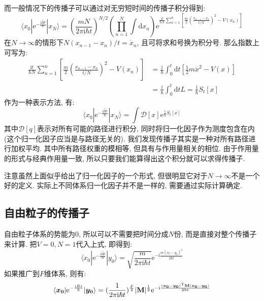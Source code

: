        \splitline

        而一般情况下的传播子可以通过对无穷短时间的传播子积分得到:
        \begin{equation}
            \langle x_0 | \mathrm{e}^{-\frac {\mathrm{i}\hat{H}t}{\hbar}} | x_N \rangle = \left(\frac{mN}{2\pi\mathrm{i}\hbar t}\right)^{N/2} \left(\prod_{n = 1}^{N}\int 
            \mathrm{d} x_n \right) \mathrm{e}^{ \frac{\mathrm{i}t}{\hbar N} \sum_{n = 1}^{n} \left[ \frac{m}{2} \left(\frac{x_{n-1} - x_n}{t/N}\right)^2 - V(x_n)\right] }
        \end{equation}
        在$N \to \infty$的情形下$N(x_{n-1} - x_n)/t = \dot x_n$, 且可将求和号换为积分号. 那么指数上可写为: 
        \begin{equation}\begin{aligned}
            \frac{\mathrm{i}t}{\hbar N} \sum_{n = 1}^{n} \left[ \frac{m}{2} \left(\frac{x_{n-1} - x_n}{t/N}\right)^2 - V(x_n)\right] &= \frac{\mathrm{i}}{\hbar} \int_0^t \mathrm{d}t \left[ \frac{1}{2} m \dot x^2 - V(x) \right]\\
            &= \frac{\mathrm{i}}{\hbar} \int_0^t \mathrm{d}t L = \frac{\mathrm{i}}{\hbar} S_t[x]
        \end{aligned}\end{equation}
        作为一种表示方法, 有: 
        \begin{equation}\label{eq:8-2-1}
            \langle x_0 | \mathrm{e}^{-\frac {\mathrm{i}\hat{H}t}{\hbar}} | x_N \rangle = \int \mathcal{D}[x] \mathrm{e}^{ \frac{\mathrm{i}}{\hbar} S_t[x] }
        \end{equation}
        其中$\mathcal{D}[q]$表示对所有可能的路径进行积分, 同时将归一化因子作为测度包含在内(这个归一化因子应当是与路径无关的). 我们发现传播子其实是一种对所有路径进行加权平均. 其中所有路径权重的模相等, 但具有与作用量相关的相位. 由于作用量的形式与经典作用量一致, 所以只要我们能算得出这个积分就可以求得传播子. 

        注意虽然上面似乎给出了归一化因子的一个形式, 但很明显它对于$N \to \infty$不是一个好的定义. 实际上不同体系归一化因子并不是一样的, 需要通过实际计算确定. 

        \subsection{自由粒子的传播子}

        自由粒子体系的势能为0, 所以可以不需要把时间分成$N$份, 而是直接对整个传播子来计算. 把$V=0,N=1$代入上式, 即得到:
        \begin{equation}\label{eq:8-2-2}
            \langle x_0 | \mathrm{e}^{-\frac {\mathrm{i}\hat{H}t}{\hbar}} | y_0 \rangle = \sqrt{\frac {m}{2\pi\mathrm{i} \hbar t}} \mathrm{e}^{-\mathrm{i}\frac {m(x_0 - y_0)^2}{2\hbar t}}
        \end{equation}
        如果推广到$F$维体系, 则有:
        \begin{equation}
            \langle \bm{x_0} | \mathrm{e}^{-\frac {\mathrm{i}\hat{H}t}{\hbar}} |\bm{y_0} \rangle = (\frac {1}{2\pi\mathrm{i} \hbar t})^{\frac F2} |\mathbf{M}|^{\frac 12} \mathrm{e}^{-\mathrm{i}\frac {(\bm{x_0}-\bm{y_0})^{\mathrm{T}} \mathbf{M} (\bm{x_0}-\bm{y_0})}{2\hbar t}}
        \end{equation}

